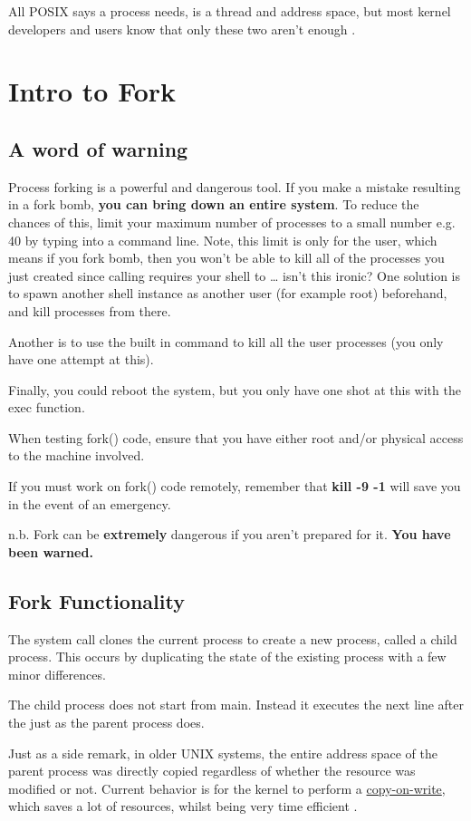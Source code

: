 \begin{itemize}
All POSIX says a process needs, is a thread and address space, but most kernel developers and users know that only these two aren't enough \cite{process_def}.

\section{Intro to Fork}

\subsection{A word of warning}

Process forking is a powerful and dangerous tool.
If you make a mistake resulting in a fork bomb, \textbf{you can bring down an entire system}.
To reduce the chances of this, limit your maximum number of processes to a small number e.g. 40 by typing  into a command line.
Note, this limit is only for the user, which means if you fork bomb, then you won't be able to kill all of the processes you just created since calling  requires your shell to  \ldots{} isn't this ironic? One solution is to spawn another shell instance as another user (for example root) beforehand, and kill processes from there.

Another is to use the built in  command to kill all the user processes (you only have one attempt at this).

Finally, you could reboot the system, but you only have one shot at this with the exec function.

When testing fork() code, ensure that you have either root and/or physical access to the machine involved.

If you must work on fork() code remotely, remember that \textbf{kill -9 -1} will save you in the event of an emergency.

n.b. Fork can be \textbf{extremely} dangerous if you aren't prepared for it. \textbf{You have been warned.}

\subsection{Fork Functionality}

The  system call clones the current process to create a new process, called a child process.
This occurs by duplicating the state of the existing process with a few minor differences.
\begin{itemize} {
    \item The child process does not start from main. Instead it executes the next line after the  just as the parent process does.
    \item Just as a side remark, in older UNIX systems, the entire address space of the parent process was directly copied regardless of whether the resource was modified or not. Current behavior is for the kernel to perform a \href{https://en.wikipedia.org/wiki/Copy-on-write}{copy-on-write}, which saves a lot of resources, whilst being very time efficient \cite[Copy-on-write section]{Bovet:2005:ULK:1077084}.
}


\end{itemize}
\end{itemize}
